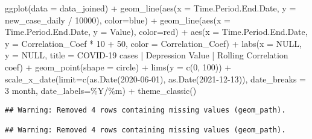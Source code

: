 \documentclass[
]{article}
\newenvironment{Shaded}{\begin{snugshade}}{\end{snugshade}}
\newcommand{\AttributeTok}[1]{\textcolor[rgb]{0.77,0.63,0.00}{#1}}
\newcommand{\ConstantTok}[1]{\textcolor[rgb]{0.00,0.00,0.00}{#1}}
\newcommand{\DecValTok}[1]{\textcolor[rgb]{0.00,0.00,0.81}{#1}}
\newcommand{\FunctionTok}[1]{\textcolor[rgb]{0.00,0.00,0.00}{#1}}
\newcommand{\NormalTok}[1]{#1}
\newcommand{\SpecialCharTok}[1]{\textcolor[rgb]{0.00,0.00,0.00}{#1}}
\newcommand{\StringTok}[1]{\textcolor[rgb]{0.31,0.60,0.02}{#1}}
\begin{document}
\begin{Shaded}
\begin{Highlighting}[]
\FunctionTok{ggplot}\NormalTok{(}\AttributeTok{data =}\NormalTok{ data\_joined) }\SpecialCharTok{+}
  \FunctionTok{geom\_line}\NormalTok{(}\FunctionTok{aes}\NormalTok{(}\AttributeTok{x =}\NormalTok{ Time.Period.End.Date, }\AttributeTok{y =}\NormalTok{ new\_case\_daily }\SpecialCharTok{/} \DecValTok{10000}\NormalTok{), }\AttributeTok{color=}\StringTok{\textquotesingle{}blue\textquotesingle{}}\NormalTok{) }\SpecialCharTok{+}
  \FunctionTok{geom\_line}\NormalTok{(}\FunctionTok{aes}\NormalTok{(}\AttributeTok{x =}\NormalTok{ Time.Period.End.Date, }\AttributeTok{y =}\NormalTok{ Value), }\AttributeTok{color=}\StringTok{\textquotesingle{}red\textquotesingle{}}\NormalTok{) }\SpecialCharTok{+}
  \FunctionTok{aes}\NormalTok{(}\AttributeTok{x =}\NormalTok{ Time.Period.End.Date, }\AttributeTok{y =}\NormalTok{ Correlation\_Coef }\SpecialCharTok{*} \DecValTok{10} \SpecialCharTok{+} \DecValTok{50}\NormalTok{, }\AttributeTok{color =}\NormalTok{ Correlation\_Coef) }\SpecialCharTok{+}
  \FunctionTok{labs}\NormalTok{(}\AttributeTok{x =} \ConstantTok{NULL}\NormalTok{, }\AttributeTok{y =} \ConstantTok{NULL}\NormalTok{, }\AttributeTok{title =} \StringTok{\textquotesingle{}COVID{-}19 cases | Depression Value | Rolling Correlation coef\textquotesingle{}}\NormalTok{) }\SpecialCharTok{+}
  \FunctionTok{geom\_point}\NormalTok{(}\AttributeTok{shape =} \StringTok{\textquotesingle{}circle\textquotesingle{}}\NormalTok{) }\SpecialCharTok{+}
  \FunctionTok{lims}\NormalTok{(}\AttributeTok{y =} \FunctionTok{c}\NormalTok{(}\DecValTok{0}\NormalTok{, }\DecValTok{100}\NormalTok{)) }\SpecialCharTok{+}
  \FunctionTok{scale\_x\_date}\NormalTok{(}\AttributeTok{limit=}\FunctionTok{c}\NormalTok{(}\FunctionTok{as.Date}\NormalTok{(}\StringTok{\textquotesingle{}2020{-}06{-}01\textquotesingle{}}\NormalTok{), }\FunctionTok{as.Date}\NormalTok{(}\StringTok{\textquotesingle{}2021{-}12{-}13\textquotesingle{}}\NormalTok{)), }\AttributeTok{date\_breaks =} \StringTok{\textquotesingle{}3 month\textquotesingle{}}\NormalTok{, }\AttributeTok{date\_labels=}\StringTok{\textquotesingle{}\%Y/\%m\textquotesingle{}}\NormalTok{) }\SpecialCharTok{+}
  \FunctionTok{theme\_classic}\NormalTok{()}
\end{Highlighting}
\end{Shaded}

\begin{verbatim}
## Warning: Removed 4 rows containing missing values (geom_path).

## Warning: Removed 4 rows containing missing values (geom_path).
\end{verbatim}
\end{document}
